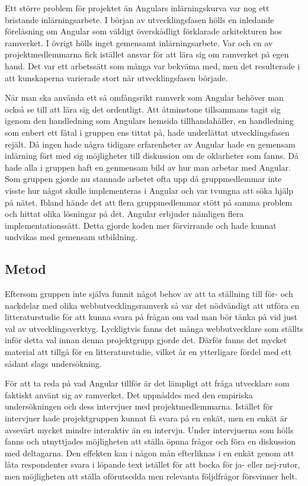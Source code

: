 Ett större problem för projektet än Angulars inlärningskurva var nog ett bristande inlärningsarbete. I början av utvecklingsfasen hölls en inledande föreläsning om Angular som väldigt överskådligt förklarade arkitekturen hos ramverket. I övrigt hölls inget gemensamt inlärningsarbete. Var och en av projektmedlemmarna fick istället ansvar för att lära sig om ramverket på egen hand. Det var ett arbetssätt som många var bekväma med, men det resulterade i att kunskaperna varierade stort när utvecklingsfasen började. 

När man ska använda ett så omfångsrikt ramverk som Angular behöver man också se till att lära sig det ordentligt. Att åtminstone tillsammans tagit sig igenom den handledning som Angulars hemsida tillhandahåller, en handledning som enbert ett fåtal i gruppen ens tittat på, hade underlättat utvecklingsfasen rejält. Då ingen hade några tidigare erfarenheter av Angular hade en gemensam inlärning fört med sig möjligheter till diskussion om de oklarheter som fanns. Då hade alla i gruppen haft en genmensam bild av hur man arbetar med Angular. Som gruppen gjorde nu stannade arbetet ofta upp då gruppmedlemmar inte visste hur något skulle implementeras i Angular och var tvungna att söka hjälp på nätet. Ibland hände det att flera gruppmedlemmar stött på samma problem och hittat olika lösningar på det. Angular erbjuder nämligen flera implementationssätt. Detta gjorde koden mer förvirrande och hade kunnat undvikas med gemensam utbildning.     

     


\subsection{Metod}

Eftersom gruppen inte själva funnit något behov av att ta ställning till för- och nackdelar med olika webbutvecklingsramverk så var det nödvändigt att utföra en litteraturstudie för att kunna svara på frågan om vad man bör tänka på vid just val av utvecklingsverktyg. Lyckligtvis fanns det många webbutvecklare som ställts inför detta val innan denna projektgrupp gjorde det. Därför fanns det mycket material att tillgå för en litteraturstudie, vilket är en ytterligare fördel med ett sådant slags undersökning.

För att ta reda på vad Angular tillför är det lämpligt att fråga utvecklare som faktiskt använt sig av ramverket. Det uppnåddes med den empiriska undersökningen och dess intervjuer med projektmedlemmarna. Istället för intervjuer hade projektgruppen kunnat få svara på en enkät, men en enkät är avsevärt mycket mindre interaktiv än en intervju. Under intervjuerna som hölls fanns och utnyttjades möjligheten att ställa öpnna frågor och föra en diskussion med deltagarna. Den effekten kan i någon mån efterliknas i en enkät genom att låta respondenter svara i löpande text istället för att bocka för ja- eller nej-rutor, men möjligheten att ställa oförutsedda men relevanta följdfrågor försvinner helt. 

